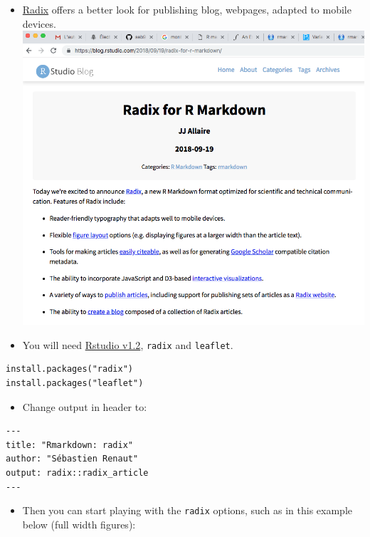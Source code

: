 \documentclass[]{article}
\providecommand{\tightlist}{%
  \setlength{\itemsep}{0pt}\setlength{\parskip}{0pt}}
\begin{document}
\begin{itemize}
\item
  \href{https://blog.rstudio.com/2018/09/19/radix-for-r-markdown/}{Radix}
  offers a better look for publishing blog, webpages, adapted to mobile
  devices.\\
  \includegraphics[width=5.20833in,height=\textheight]{../figures/radix.png}
\item
  You will need
  \href{https://www.rstudio.com/products/rstudio/download/preview/}{Rstudio
  v1.2}, \texttt{radix} and \texttt{leaflet}.
\end{itemize}

\begin{verbatim}
install.packages("radix")  
install.packages("leaflet")  
\end{verbatim}

\begin{itemize}
\tightlist
\item
  Change output in header to:
\end{itemize}

\begin{verbatim}
---  
title: "Rmarkdown: radix"  
author: "Sébastien Renaut"  
output: radix::radix_article  
---  
\end{verbatim}

\begin{itemize}
\tightlist
\item
  Then you can start playing with the \texttt{radix} options, such as in
  this example below (full width figures):
\end{itemize}
\end{document}
